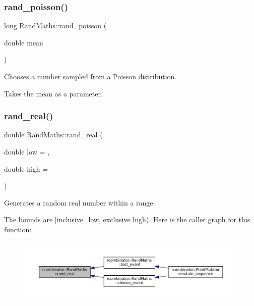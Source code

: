 \subsubsection{\texorpdfstring{rand\+\_\+poisson()}{rand\_poisson()}}
{\footnotesize\ttfamily long Rand\+Maths\+::rand\+\_\+poisson (\begin{DoxyParamCaption}\item[{double}]{mean }\end{DoxyParamCaption})}



Chooses a number sampled from a Poisson distribution. 

Takes the mean as a parameter. \mbox{\label{classrcombinator_1_1RandMaths_aa6441baa59bff50f588c0c54e3c54140}} 
\subsubsection{\texorpdfstring{rand\+\_\+real()}{rand\_real()}}
{\footnotesize\ttfamily double Rand\+Maths\+::rand\+\_\+real (\begin{DoxyParamCaption}\item[{double}]{low = {},  }\item[{double}]{high = {} }\end{DoxyParamCaption})}



Generates a random real number within a range. 

The bounds are \mbox{[}inclusive\+\_\+low, exclusive high). Here is the caller graph for this function\+:
\nopagebreak
\begin{figure}[H]
\begin{center}
\leavevmode
\includegraphics[width=350pt]{classrcombinator_1_1RandMaths_aa6441baa59bff50f588c0c54e3c54140_icgraph}
\end{center}
\end{figure}
\mbox{\label{classrcombinator_1_1RandMaths_aaa759efa3059b6793100cb6b6442f26d}} 
